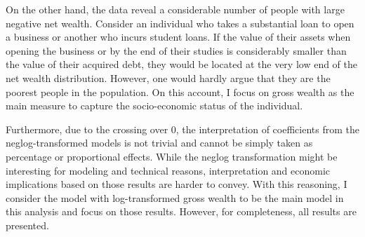 On the other hand, the data reveal a considerable number of people with large negative net wealth. Consider an
individual who takes a substantial loan to open a business or another who incurs student loans. If the value of
their assets when opening the business or by the end of their studies is considerably smaller than the value of
their acquired debt, they would be located at the very low end of the net wealth distribution. However, one
would hardly argue that they are the poorest people in the population. On this account, I focus on gross 
wealth as the main measure to capture the socio-economic status of the individual. 


Furthermore, due to the crossing over 0, the interpretation of coefficients from the neglog-transformed models
is not trivial and cannot be simply taken as percentage or proportional effects. While the neglog
transformation might be interesting for modeling and technical reasons, interpretation and economic
implications based on those results are harder to convey. With this reasoning, I consider the model with
log-transformed gross wealth to be the main model in this analysis and focus on those results. However, for
completeness, all results are presented.

